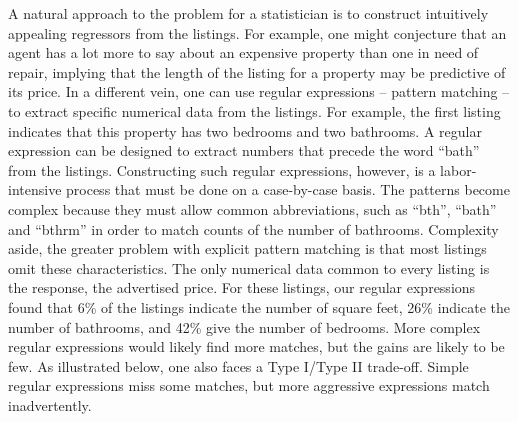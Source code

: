 \documentclass[10pt]{article}
\begin{document}
  
 A natural approach to the problem for a statistician is to construct
 intuitively appealing regressors from the listings.  For example, one might
 conjecture that an agent has a lot more to say about an expensive property than
 one in need of repair, implying that the length of the listing for a property
 may be predictive of its price.  In a different vein, one can use regular
 expressions -- pattern matching -- to extract specific numerical data from the
 listings.  For example, the first listing indicates that this property has two
 bedrooms and two bathrooms.  A regular expression can be designed to extract
 numbers that precede the word ``bath'' from the listings.  Constructing such
 regular expressions, however, is a labor-intensive process that must be done on
 a case-by-case basis.  The patterns become complex because they must allow
 common abbreviations, such as ``bth'', ``bath'' and ``bthrm'' in order to match
 counts of the number of bathrooms.  Complexity aside, the greater problem with
 explicit pattern matching is that most listings omit these characteristics.
  The only numerical data common to every listing is the response, the
 advertised price.  For these listings, our regular expressions found that 6\%
 of the listings indicate the number of square feet, 26\% indicate the number of
 bathrooms, and 42\% give the number of bedrooms.  More complex regular
 expressions would likely find more matches, but the gains are likely to be few.
  As illustrated below, one also faces a Type I/Type II trade-off.  Simple
 regular expressions miss some matches, but more aggressive expressions match
 inadvertently.
\end{document}
